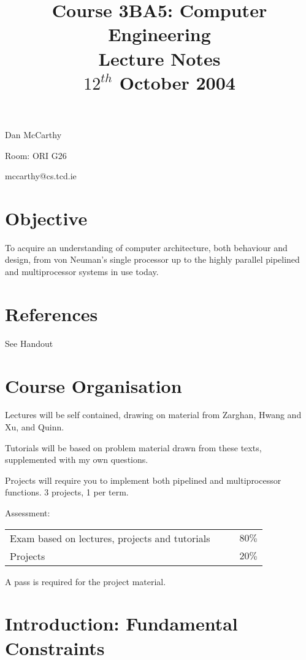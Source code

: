 \documentclass[a4paper,12pt]{article}
\begin{document}
\title{Course 3BA5: Computer Engineering \\ Lecture Notes \\ $12^{th}$ October 2004}

\maketitle

Dan McCarthy

Room: ORI G26

mccarthy@cs.tcd.ie

\section*{Objective}

To acquire an understanding of computer architecture, both behaviour and
design, from von Neuman's single processor up to the highly parallel
pipelined and multiprocessor systems in use today.

\section*{References}

See Handout

\section*{Course Organisation}

Lectures will be self contained, drawing on material from Zarghan, Hwang
and Xu, and Quinn.

Tutorials will be based on problem material drawn from these texts,
supplemented with my own questions.

Projects will require you to implement both pipelined and multiprocessor
functions. 3 projects, 1 per term.

Assessment:

\begin{tabular}{lccr}
Exam based on lectures, projects and tutorials	&	&	&	$80\%$	\\
Projects													 	&	&	&	$20\%$	
\end{tabular}

A pass is required for the project material.

\section*{Introduction: Fundamental Constraints}
\end{document}
